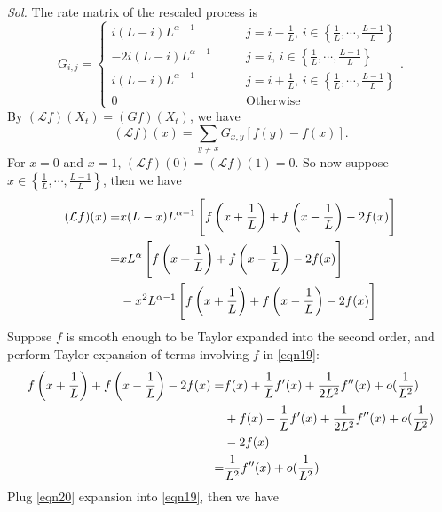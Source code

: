 \begin{enumerate}
        \textit{ Sol. }
        The rate matrix of the rescaled process is 
        $$
            G_{i,j} = \begin{cases}
                i(L-i) L^{\alpha - 1}\qquad & j = i - \frac{1}{L},\, i \in \left\{\frac{1}{L}, \cdots, \frac{L-1}{L} \right\} \\ 
                - 2i(L-i) L^{\alpha - 1} \qquad & j = i, \, i \in \left\{ \frac{1}{L}, \cdots, \frac{L-1}{L} \right\} \\
                i(L-i) L^{\alpha - 1} \qquad & j = i + \frac{1}{L},\, i \in \left\{ \frac{1}{L}, \cdots, \frac{L-1}{L} \right\} \\ 
                0 \qquad & \text{Otherwise}
            \end{cases}.
        $$
        By $(\mathcal{L}f)(X_t) = (Gf)(X_t)$, we have 
        \begin{equation*}
            (\mathcal{L}f)(x) 
            =  \sum_{y \neq x} G_{x,y} [f(y) -f(x)].
        \end{equation*}
        For $x = 0$ and $x = 1$, $(\mathcal{L}f)(0) = (\mathcal{L}f)(1) = 0$. So now suppose $x \in \left\{\frac{1}{L}, \cdots, \frac{L-1}{L}\right\}$, then we have 
        \begin{align}\label{eqn19}
            (\mathcal{L}f)(x) = & x(L-x)L^{\alpha-1} \left[f\left(x+\frac{1}{L}\right) + f\left(x-\frac{1}{L}\right) - 2 f(x) \right] \notag \\ 
            = & x L^\alpha  \left[f\left(x+\frac{1}{L}\right) + f\left(x-\frac{1}{L}\right) - 2 f(x) \right] \notag\\ 
            & - x^2 L^{\alpha-1}  \left[f\left(x+\frac{1}{L}\right) + f\left(x-\frac{1}{L}\right) - 2 f(x) \right]
        \end{align}
        Suppose $f$ is smooth enough to be Taylor expanded into the second order, and perform Taylor expansion of terms involving $f$ in \eqref{eqn19}:
        \begin{align}\label{eqn20}
            f\left(x+\frac{1}{L}\right) + f\left(x-\frac{1}{L}\right) - 2 f(x) = & f(x) + \frac{1}{L}f'(x) + \frac{1}{2L^2} f''(x) + o(\frac{1}{L^2}) \notag \\ 
            & + f(x) - \frac{1}{L}f'(x) + \frac{1}{2L^2} f''(x) + o(\frac{1}{L^2}) \notag \\ 
            & - 2f(x) \notag \\ 
            = & \frac{1}{L^2} f''(x) + o(\frac{1}{L^2})
        \end{align}
        Plug \eqref{eqn20} expansion into \eqref{eqn19}, then we have 

\end{enumerate}
